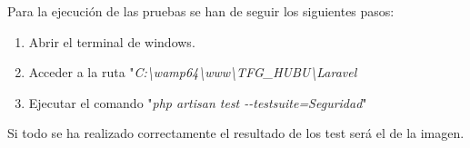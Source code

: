 Para la ejecución de las pruebas se han de seguir los siguientes pasos:

\begin{enumerate}
    \item Abrir el terminal de windows.
    \item Acceder a la ruta "\textit{C:\textbackslash{}wamp64\textbackslash{}www\textbackslash{}TFG\_HUBU\textbackslash{}Laravel}
    \item Ejecutar el comando "\textit{php artisan test -{}-testsuite=Seguridad}"
\end{enumerate}

Si todo se ha realizado correctamente el resultado de los test será el de la imagen.


